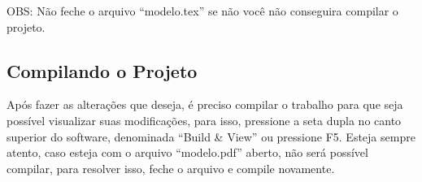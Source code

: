 OBS: Não feche o arquivo ``modelo.tex'' se não você não conseguira compilar o projeto.

\subsection{Compilando o Projeto}
Após fazer as alterações que deseja, é preciso compilar o trabalho para que seja possível visualizar suas modificações, para isso, pressione a seta dupla no canto superior do software, denominada ``Build \& View'' ou pressione F5. Esteja sempre atento, caso esteja com o arquivo ``modelo.pdf'' aberto, não será possível compilar, para resolver isso, feche o arquivo e compile novamente.